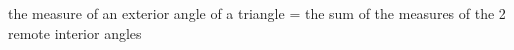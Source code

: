 \documentclass[preview]{standalone}
\begin{document}
\begin{flushleft}
the measure of an exterior angle of a triangle = the sum of the measures of the 2 remote interior angles
\end{flushleft}
\end{document}

